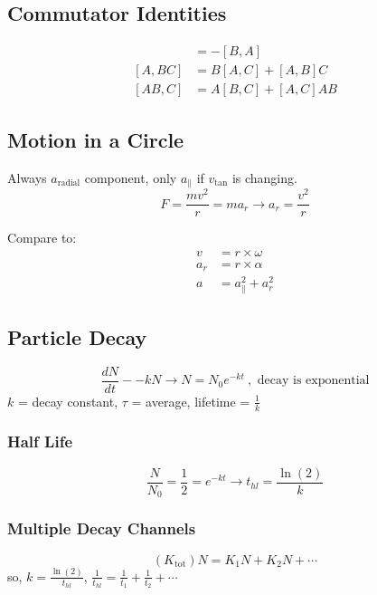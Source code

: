 \documentclass[10pt,letter]{article}
\begin{document}
\subsection{Commutator Identities}
\begin{align}
 [A,B] &= -[B,A] \\
 [A,BC] &= B[A,C] + [A,B]C\\
 [AB,C] &= A[B,C] + [A,C]AB
\end{align}

\subsection{Motion in a Circle}
Always $a_{\textrm{radial}}$ component, only $a_{\parallel}$ if $v_{\textrm{tan}}$ is changing.
\begin{equation}
 F = \frac{mv^2}{r} = ma_r \rightarrow a_r = \frac{v^2}{r}
\end{equation}

Compare to:
\begin{align}
 v &= r \times \omega\\
 a_r &= r \times \alpha \\
 a &= a^2_{\parallel} + a^2_r
\end{align}

\subsection{Particle Decay}
\begin{equation}
 \frac{dN}{dt} - -kN \rightarrow N = N_0 e^{-kt}~,\textrm{ decay is exponential}
\end{equation}
$k$ = decay constant, $\tau$ = average, lifetime = $\frac{1}{k}$
\subsubsection{Half Life}
\begin{equation}
 \frac{N}{N_0} = \frac{1}{2} = e^{-kt} \rightarrow t_{hl} = \frac{\ln(2)}{k}
\end{equation}

\subsubsection{Multiple Decay Channels}
\begin{equation}
 (K_{\textrm{tot}})N = K_1N + K_2N + \cdots
\end{equation}
so, $k = \frac{\ln(2)}{t_{hl}}$, $\frac{1}{t_{hl}} = \frac{1}{t_1} + \frac{1}{t_2} + \cdots$
\end{document}
